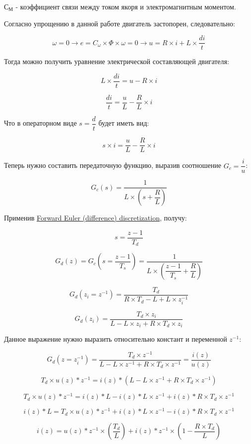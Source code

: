 \documentclass[11pt]{article}
\begin{document}
\(С_М\) - коэффициент связи между током якоря и электромагнитным
моментом.

    Согласно упрощению в данной работе двигатель застопорен, следовательно:

\[
\omega = 0 \to e = C_{\omega} \times \Phi \times \omega = 0 \to u = R \times i + L \times \dfrac{di}{t}
\]

Тогда можно получить уравнение электрической составляющей двигателя:

\[
L \times \dfrac{di}{t} = u  - R \times i
\]

\[
\dfrac{di}{t} = \dfrac{u}{L}  - \dfrac{R}{L} \times i
\]

Что в операторном виде \(s = \dfrac{d}{t}\) будет иметь вид:

\[
s \times i = \dfrac{u}{L}  - \dfrac{R}{L} \times i
\]

Теперь нужно составить передаточную функцию, выразив соотношение
\(G_c = \dfrac{i}{u}\):

\[
G_c(s) = \dfrac{1}{L \times (s + \dfrac{R}{L})}
\]

Применив
\href{https://x-engineer.org/discretizing-transfer-function/\#:~:text=Discretization\%20is\%20the\%20process\%20through,out\%20computing\%20and\%20control\%20tasks.}{Forward
Euler (difference) discretization}, получу:

\[
s = \dfrac{z - 1}{T_d}
\]

\[
G_d(z) = G_c(s=\dfrac{z - 1}{T_s}) = \dfrac{1}{L \times (\dfrac{z - 1}{T_s} + \dfrac{R}{L})}
\]

\[
G_d(z_i=z^{-1}) = \dfrac{T_d}{R \times T_d - L + L \times z_i^{-1}}
\]

\[
G_d(z_i) = \dfrac{T_d \times z_i}{L - L \times z_i + R \times T_d \times z_i}
\]

Данное выражение нужно выразить относительно констант и переменной
\(z^{-1}\):

\[
G_d(z=z_i^{-1}) = \dfrac{T_d \times z^{-1}}{L - L \times z^{-1} + R \times T_d \times z^{-1}} = \dfrac{i(z)}{u(z)}
\]

\[
T_d \times u(z)*z^{-1} = i(z)*(L - L \times z^{-1} + R \times T_d \times z^{-1})
\]

\[
T_d \times u(z)*z^{-1} = i(z)*L - i(z)*L \times z^{-1} + i(z)*R \times T_d \times z^{-1}
\]

\[
i(z)*L = T_d \times u(z)*z^{-1} + i(z)*L \times z^{-1} - i(z)*R \times T_d \times z^{-1}
\]

\[
i(z) = u(z)*z^{-1} \times (\dfrac{T_d}{L}) + i(z)*z^{-1} \times (1 - \dfrac{R \times T_d}{L})
\]
\end{document}
